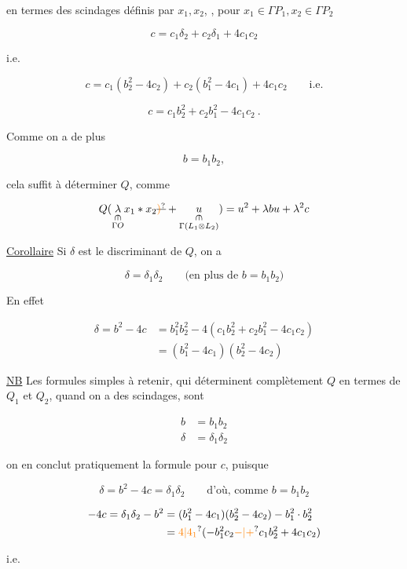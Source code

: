 en termes des scindages définis par $x_1,x_2$, , pour $x_1\in\Gamma P_1,x_2\in\Gamma P_2$

\[ \boxed{c=c_1\delta_2+c_2\delta_1+4c_1c_2} \]


i.e. 

\[ c=c_1(b_2^2-4c_2)+c_2(b_1^2-4c_1)+4c_1c_2\qquad\text{i.e.} \]

\[ \boxed{c=c_1b_2^2+c_2b_1^2-4c_1c_2}\ . \]

Comme on a de plus

\[ \boxed{b=b_1b_2}, \]

cela suffit à déterminer $Q$, comme

\[ Q(\underset{\substack{\rotatebox{-90}{$\in$}\\\Gamma O}}{\lambda}x_1*x_2\deleted{\unsure{)}}+\underset{\substack{\rotatebox{-90}{$\in$}\\\Gamma(L_1\otimes L_2)}}{u})=u^2+\lambda bu+\lambda^2c \]

\uline{Corollaire} Si $\delta$ est le discriminant de $Q$, on a

\[ \delta=\delta_1\delta_2\qquad\text{(en plus de }b=b_1b_2\text{)} \]

En effet

\[ \begin{aligned}\delta=b^2-4c&=b_1^2 b_2^2-4(c_1b_2^2+c_2b_1^2-4c_1c_2)\\ &=(b_1^2-4c_1)(b_2^2-4c_2)\end{aligned} \]

\uline{NB} Les formules simples à retenir, qui déterminent complètement $Q$ en termes de $Q_1$ et $Q_2$, quand on a des scindages, sont

\[ \boxed{\begin{aligned} b&=b_1b_2\\\delta&=\delta_1\delta_2\end{aligned}} \]

on en conclut pratiquement la formule pour $c$, puisque

\[ \delta=b^2-4c=\delta_1\delta_2\qquad\text{d'où, comme }b=b_1b_2 \]

\[ \begin{aligned}-4c=\delta_1\delta_2-b^2&=(b_1^2-4c_1)(b_2^2-4c_2)-b_1^2\cdot b_2^2\\ &=\unsure{4|4_1}(-b_1^2c_2\unsure{-|+}c_1b_2^2+4c_1c_2)\end{aligned} \]


i.e.

